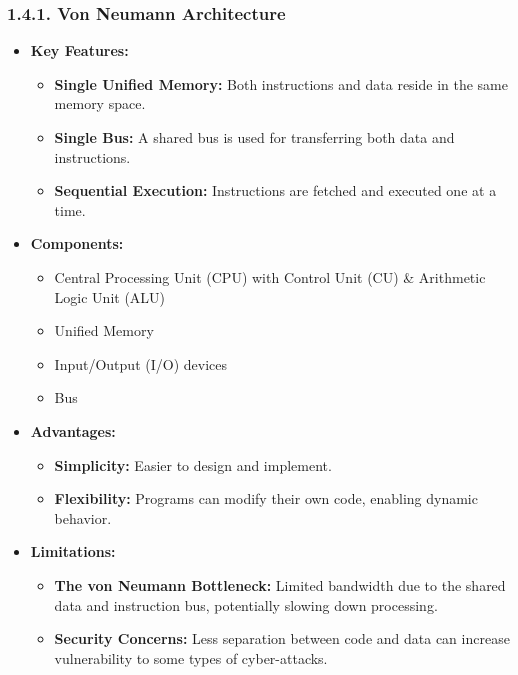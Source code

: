 \documentclass[
]{article}
\begin{document}
\hypertarget{141-von-neumann-architecture}{%
\subsubsection{1.4.1. Von Neumann
Architecture}\label{141-von-neumann-architecture}}

\begin{itemize}
\item
  \textbf{Key Features:}

  \begin{itemize}
  \item
    \textbf{Single Unified Memory:} Both instructions and data reside in
    the same memory space.
  \item
    \textbf{Single Bus:} A shared bus is used for transferring both data
    and instructions.
  \item
    \textbf{Sequential Execution:} Instructions are fetched and executed
    one at a time.
  \end{itemize}
\item
  \textbf{Components:}

  \begin{itemize}
  \item
    Central Processing Unit (CPU) with Control Unit (CU) \& Arithmetic
    Logic Unit (ALU)
  \item
    Unified Memory
  \item
    Input/Output (I/O) devices
  \item
    Bus
  \end{itemize}
\item
  \textbf{Advantages:}

  \begin{itemize}
  \item
    \textbf{Simplicity:} Easier to design and implement.
  \item
    \textbf{Flexibility:} Programs can modify their own code, enabling
    dynamic behavior.
  \end{itemize}
\item
  \textbf{Limitations:}

  \begin{itemize}
  \item
    \textbf{The von Neumann Bottleneck:} Limited bandwidth due to the
    shared data and instruction bus, potentially slowing down
    processing.
  \item
    \textbf{Security Concerns:} Less separation between code and data
    can increase vulnerability to some types of cyber-attacks.
  \end{itemize}
\end{itemize}
\end{document}
